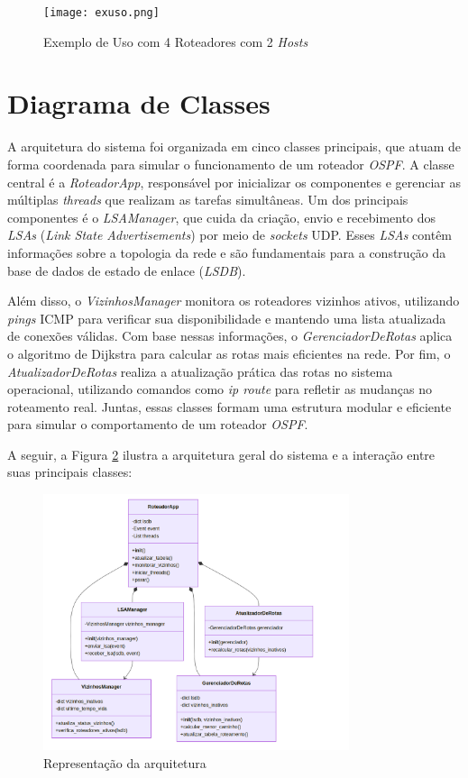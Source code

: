\documentclass[12pt,a4paper]{report}
\begin{document}
\begin{figure}[h!]
    \centering
    \texttt{[image: exuso.png]}
    \caption{Exemplo de Uso com 4 Roteadores com 2 \textit{Hosts}}
    \label{fig:uso}
\end{figure}

\section{Diagrama de Classes}
A arquitetura do sistema foi organizada em cinco classes principais, que atuam de forma coordenada para simular o funcionamento de um roteador \textit{OSPF}. A classe central é a \textit{RoteadorApp}, responsável por inicializar os componentes e gerenciar as múltiplas \textit{threads} que realizam as tarefas simultâneas. Um dos principais componentes é o \textit{LSAManager}, que cuida da criação, envio e recebimento dos \textit{LSAs} (\textit{Link State Advertisements}) por meio de \textit{sockets} UDP. Esses \textit{LSAs} contêm informações sobre a topologia da rede e são fundamentais para a construção da base de dados de estado de enlace (\textit{LSDB}).

Além disso, o \textit{VizinhosManager} monitora os roteadores vizinhos ativos, utilizando \textit{pings} ICMP para verificar sua disponibilidade e mantendo uma lista atualizada de conexões válidas. Com base nessas informações, o \textit{GerenciadorDeRotas} aplica o algoritmo de Dijkstra para calcular as rotas mais eficientes na rede. Por fim, o \textit{AtualizadorDeRotas} realiza a atualização prática das rotas no sistema operacional, utilizando comandos como \textit{ip route} para refletir as mudanças no roteamento real. Juntas, essas classes formam uma estrutura modular e eficiente para simular o comportamento de um roteador \textit{OSPF}.

A seguir, a Figura \ref{fig:classes} ilustra a arquitetura geral do sistema e a interação entre suas principais classes:

\begin{figure}[h!]
    \centering
    \includegraphics[width=0.8\textwidth]{diagrama_classes.png}
    \caption{Representação da arquitetura}
    \label{fig:classes}
\end{figure}
\end{document}
